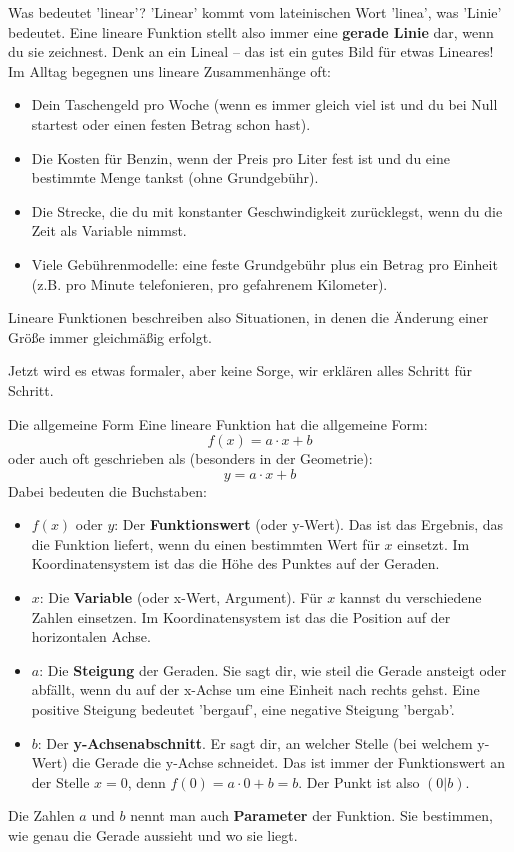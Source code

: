 \begin{infoboxumgebung}{Was bedeutet 'linear'?}
'Linear' kommt vom lateinischen Wort 'linea', was 'Linie' bedeutet. Eine lineare Funktion stellt also immer eine \textbf{gerade Linie} dar, wenn du sie zeichnest. Denk an ein Lineal – das ist ein gutes Bild für etwas Lineares!
Im Alltag begegnen uns lineare Zusammenhänge oft:
\begin{itemize}
    \item Dein Taschengeld pro Woche (wenn es immer gleich viel ist und du bei Null startest oder einen festen Betrag schon hast).
    \item Die Kosten für Benzin, wenn der Preis pro Liter fest ist und du eine bestimmte Menge tankst (ohne Grundgebühr).
    \item Die Strecke, die du mit konstanter Geschwindigkeit zurücklegst, wenn du die Zeit als Variable nimmst.
    \item Viele Gebührenmodelle: eine feste Grundgebühr plus ein Betrag pro Einheit (z.B. pro Minute telefonieren, pro gefahrenem Kilometer).
\end{itemize}
Lineare Funktionen beschreiben also Situationen, in denen die Änderung einer Größe immer gleichmäßig erfolgt.
\end{infoboxumgebung}

Jetzt wird es etwas formaler, aber keine Sorge, wir erklären alles Schritt für Schritt.

\begin{merksatzumgebung}{Die allgemeine Form}
Eine lineare Funktion hat die allgemeine Form:
\[ f(x) = a \cdot x + b \]
oder auch oft geschrieben als (besonders in der Geometrie):
\[ y = a \cdot x + b \]
Dabei bedeuten die Buchstaben:
\begin{itemize}
    \item $f(x)$ oder $y$: Der \textbf{Funktionswert} (oder y-Wert). Das ist das Ergebnis, das die Funktion liefert, wenn du einen bestimmten Wert für $x$ einsetzt. Im Koordinatensystem ist das die Höhe des Punktes auf der Geraden.
    \item $x$: Die \textbf{Variable} (oder x-Wert, Argument). Für $x$ kannst du verschiedene Zahlen einsetzen. Im Koordinatensystem ist das die Position auf der horizontalen Achse.
    \item $a$: Die \textbf{Steigung} der Geraden. Sie sagt dir, wie steil die Gerade ansteigt oder abfällt, wenn du auf der x-Achse um eine Einheit nach rechts gehst. Eine positive Steigung bedeutet 'bergauf', eine negative Steigung 'bergab'.
    \item $b$: Der \textbf{y-Achsenabschnitt}. Er sagt dir, an welcher Stelle (bei welchem y-Wert) die Gerade die y-Achse schneidet. Das ist immer der Funktionswert an der Stelle $x=0$, denn $f(0) = a \cdot 0 + b = b$. Der Punkt ist also $(0|b)$.
\end{itemize}
Die Zahlen $a$ und $b$ nennt man auch \textbf{Parameter} der Funktion. Sie bestimmen, wie genau die Gerade aussieht und wo sie liegt.
\end{merksatzumgebung}



